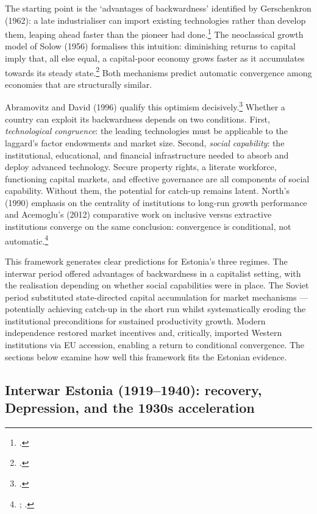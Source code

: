 \documentclass[12pt,a4paper]{article}
\begin{document}
The starting point is the `advantages of backwardness' identified by Gerschenkron (1962): a late industrialiser can import existing technologies rather than develop them, leaping ahead faster than the pioneer had done.\footnote{\autocite[8]{gerschenkron1962}.} The neoclassical growth model of Solow (1956) formalises this intuition: diminishing returns to capital imply that, all else equal, a capital-poor economy grows faster as it accumulates towards its steady state.\footnote{\autocite[70--71]{solow1956}.} Both mechanisms predict automatic convergence among economies that are structurally similar.

Abramovitz and David (1996) qualify this optimism decisively.\footnote{\autocite{abramovitz_david1996}.} Whether a country can exploit its backwardness depends on two conditions. First, \textit{technological congruence}: the leading technologies must be applicable to the laggard's factor endowments and market size. Second, \textit{social capability}: the institutional, educational, and financial infrastructure needed to absorb and deploy advanced technology. Secure property rights, a literate workforce, functioning capital markets, and effective governance are all components of social capability. Without them, the potential for catch-up remains latent. North's (1990) emphasis on the centrality of institutions to long-run growth performance and Acemoglu's (2012) comparative work on inclusive versus extractive institutions converge on the same conclusion: convergence is conditional, not automatic.\footnote{\autocite{north1990}; \autocite{acemoglu_whynationsfail}.}

This framework generates clear predictions for Estonia's three regimes. The interwar period offered advantages of backwardness in a capitalist setting, with the realisation depending on whether social capabilities were in place. The Soviet period substituted state-directed capital accumulation for market mechanisms — potentially achieving catch-up in the short run whilst systematically eroding the institutional preconditions for sustained productivity growth. Modern independence restored market incentives and, critically, imported Western institutions via EU accession, enabling a return to conditional convergence. The sections below examine how well this framework fits the Estonian evidence.

\subsection{Interwar Estonia (1919--1940): recovery, Depression, and the 1930s acceleration}
\label{subsec:interwar-implications}
\end{document}
